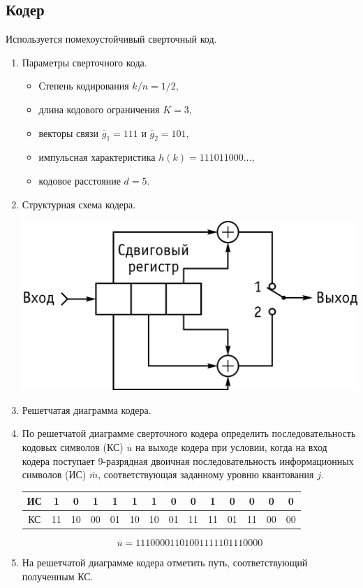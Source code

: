 \documentclass[a4paper, 12pt]{article}
\begin{document}
\subsection{Кодер}
Используется помехоустойчивый сверточный код.

\begin{enumerate}
  \item Параметры сверточного кода.
  \begin{itemize}
    \item Степень кодирования $k/n=1/2$,
    \item длина кодового ограничения $K=3$,
    \item векторы связи $\overline g_1=111$ и 
    $\overline g_2=101$,
    \item импульсная характеристика $h(k)=111011000...$,
    \item кодовое расстояние $d=5$.
  \end{itemize}

  \item Структурная схема кодера.
  \begin{center}
    \includegraphics[scale=0.8]{coder2}
  \end{center}

  \item Решетчатая диаграмма кодера.
  

  \item По решетчатой диаграмме сверточного кодера определить
  последовательность кодовых символов (КС) $\overline u$ на выходе кодера 
  при условии, когда на вход кодера поступает 9-разрядная 
  двоичная последовательность информационных символов (ИС) 
  $\overline m$, соответствующая заданному уровню квантования $j$.
  \begin{center}
    \begin{tabular}{ |c|c|c|c|c|c|c|c|c|c|c|c|c|c| }
      \hline
      ИС &1&0&1&1&1&1&0&0&1&0&0&0&0\\
      \hline
      КС &11&10&00&01&10&10&01&11&11&01&11&00&00\\
      \hline
    \end{tabular}
  \end{center}
  \[ \overline u = 11 10 00 01 10 10 01 11 11 01 11 00 00 \]

  \item На решетчатой диаграмме кодера отметить путь, 
  соответствующий полученным КС.
  
\end{enumerate}
\end{document}
